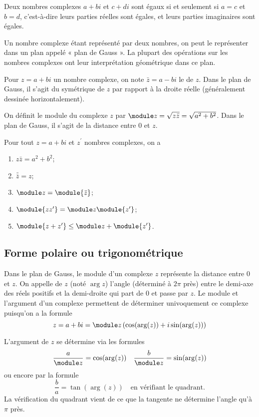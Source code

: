  Deux nombres complexes $a + bi$ et $c + di$ sont égaux si et seulement
 si $a = c$ et $b = d$, c'est-à-dire leurs parties réelles sont égales,
 et leurs parties imaginaires sont égales.

 Un nombre complexe étant représenté par deux nombres, on peut le
 représenter dans un plan appelé « plan de Gauss ». La plupart des
 opérations sur les nombres complexes ont leur interprétation
 géométrique dans ce plan.

 Pour $z = a + bi$ un nombre complexe, on note $\bar z = a - bi$ le
  de $z$. Dans le plan de Gauss, il s'agit du
 symétrique de $z$ par rapport à la droite réelle (généralement
 dessinée horizontalement).

 On définit le module du complexe $z$ par $\module z = \sqrt{z\bar z} =
 \sqrt{a^2 + b^2}$. Dans le plan de Gauss, il s'agit de la distance
 entre $0$ et $z$.

 \begin{proposition}
Pour tout $z = a+bi$ et $z^\prime$ nombres complexes, on a
   \begin{enumerate}
   \item $z \bar z = a^2 + b^2$;
   \item $\bar{\bar{z}} = z$;
   \item $\module z = \module {\bar z}$;
   \item $\module{zz^\prime} = \module z \module{z^\prime}$;
   \item $\module{z+z^\prime} \leq \module z + \module{z^\prime}$.
   \end{enumerate}
 \end{proposition}

 \subsection{Forme polaire ou trigonométrique}
 Dans le plan de Gauss, le module d'un complexe $z$ représente la
 distance entre $0$ et $z$. On appelle  de $z$ (noté
 $\arg z$) l'angle (déterminé à $2\pi$ près) entre le demi-axe des
 réels positifs et la demi-droite qui part de $0$ et passe par $z$. Le
 module et l'argument d'un complexe permettent de déterminer
 univoquement ce complexe puisqu'on a la formule
 \[z = a + bi = \module z \left( \cos(\arg(z)) + i \sin(\arg(z))
 \right)\]

 L'argument de $z$ se détermine via les formules
 \[\frac a {\module z} = \cos(\arg(z)) \quad \frac b {\module z} =
 \sin(\arg(z))\] ou encore par la formule
 \[\frac b a = \tan(\arg(z)) \quad \text{en vérifiant le
   quadrant.}\]%
 La vérification du quadrant vient de ce que la tangente ne détermine
 l'angle qu'à $\pi$ près.


